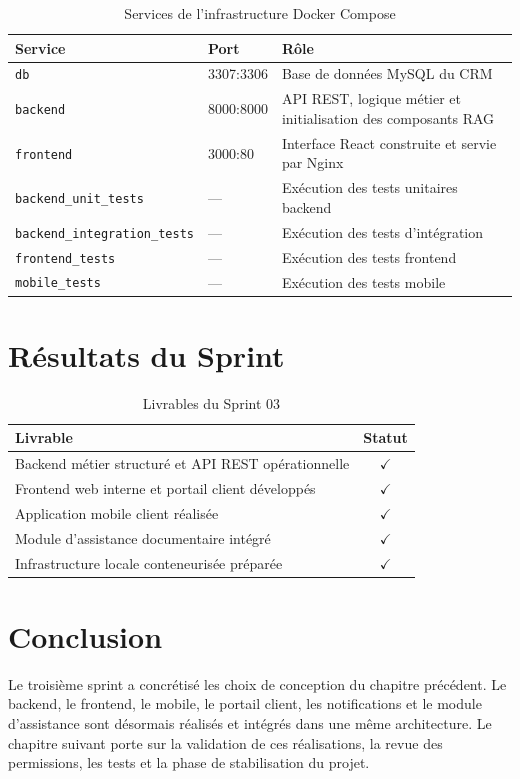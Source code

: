 \begin{table}[H]
\centering
\caption{Services de l'infrastructure Docker Compose}
\label{tab:docker_runtime}
\begin{tabularx}{\textwidth}{|l|l|X|}
\hline
\textbf{Service} & \textbf{Port} & \textbf{Rôle} \\
\hline
\texttt{db} & 3307:3306 & Base de données MySQL du CRM \\
\hline
\texttt{backend} & 8000:8000 & API REST, logique métier et initialisation des composants RAG \\
\hline
\texttt{frontend} & 3000:80 & Interface React construite et servie par Nginx \\
\hline
\texttt{backend\_unit\_tests} & --- & Exécution des tests unitaires backend \\
\hline
\texttt{backend\_integration\_tests} & --- & Exécution des tests d'intégration \\
\hline
\texttt{frontend\_tests} & --- & Exécution des tests frontend \\
\hline
\texttt{mobile\_tests} & --- & Exécution des tests mobile \\
\hline
\end{tabularx}
\end{table}

\section{Résultats du Sprint}
\begin{table}[H]
\centering
\caption{Livrables du Sprint 03}
\label{tab:livrables_s3}
\begin{tabularx}{\textwidth}{|X|c|}
\hline
\textbf{Livrable} & \textbf{Statut} \\
\hline
Backend métier structuré et API REST opérationnelle & $\checkmark$ \\
\hline
Frontend web interne et portail client développés & $\checkmark$ \\
\hline
Application mobile client réalisée & $\checkmark$ \\
\hline
Module d'assistance documentaire intégré & $\checkmark$ \\
\hline
Infrastructure locale conteneurisée préparée & $\checkmark$ \\
\hline
\end{tabularx}
\end{table}

\section{Conclusion}
Le troisième sprint a concrétisé les choix de conception du chapitre précédent. Le backend, le frontend, le mobile, le portail client, les notifications et le module d'assistance sont désormais réalisés et intégrés dans une même architecture. Le chapitre suivant porte sur la validation de ces réalisations, la revue des permissions, les tests et la phase de stabilisation du projet.
